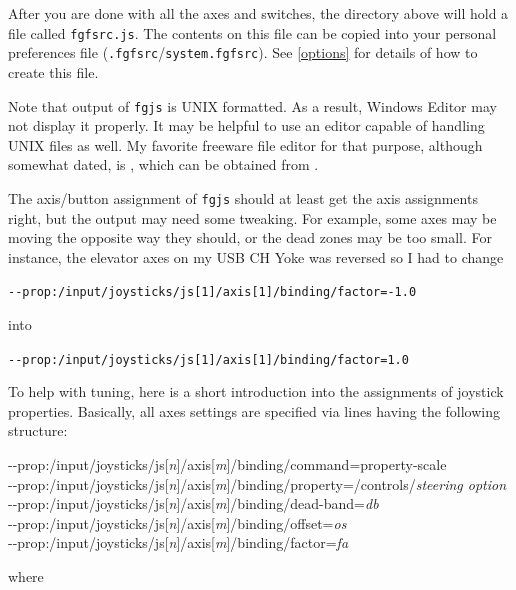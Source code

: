 {After you are done with all the axes and switches, the directory above will hold a file called \texttt{fgfsrc.js}. The contents on this file can be copied into your personal preferences file
 (\texttt{.fgfsrc}/\texttt{system.fgfsrc}). See \ref{options} for details of how to create this file.

Note that output of \texttt{fgjs} is UNIX formatted. As a result, Windows Editor
may not display it properly. It may be helpful to use an editor capable of
handling UNIX files as well. My favorite freeware file editor for that purpose,
although somewhat dated, is , which can be obtained from .

The axis/button assignment of \texttt{fgjs} should at least get the axis assignments
right, but the output may need some tweaking. For example, some axes may be moving
the opposite way they should, or the dead zones may be too small. For instance,
the elevator axes on my USB CH Yoke was reversed so I had to change

\medskip
\noindent
\texttt{-$ $-prop:/input/joysticks/js[1]/axis[1]/binding/factor=-1.0}

\medskip
into

\medskip
\noindent
\texttt{-$ $-prop:/input/joysticks/js[1]/axis[1]/binding/factor=1.0}

\medskip
To help with tuning, here is a short introduction into the assignments of joystick properties.
Basically, all axes settings are specified via lines having the following structure:
 \medskip

\begin{ttfamily}
\tiny
\noindent
-$ $-prop:/input/joysticks/js[\textit{n}]/axis[\textit{m}]/binding/command=property-scale\\
-$ $-prop:/input/joysticks/js[\textit{n}]/axis[\textit{m}]/binding/property=/controls/\textit{steering option}\\
-$ $-prop:/input/joysticks/js[\textit{n}]/axis[\textit{m}]/binding/dead-band=\textit{db}\\
-$ $-prop:/input/joysticks/js[\textit{n}]/axis[\textit{m}]/binding/offset=\textit{os}\\
-$ $-prop:/input/joysticks/js[\textit{n}]/axis[\textit{m}]/binding/factor=\textit{fa}\\
\end{ttfamily}

\medskip

\noindent
where
\medskip

}
